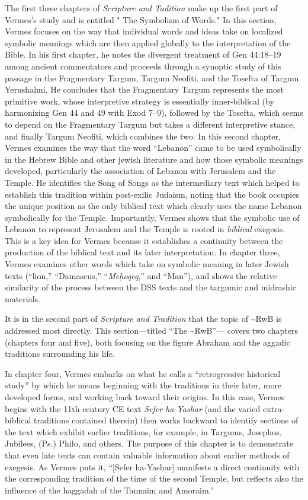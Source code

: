 The first three chapters of \emph{Scripture and Tadition} make up the
first part of Vermes's study and is entitled " The Symbolism of Words."
In this section, Vermes focuses on the way that individual words and
ideas take on localized symbolic meanings which are then applied
globally to the interpretation of the Bible. In his first chapter, he
notes the divergent treatment of Gen 44:18--19 among ancient
commentators and proceeds through a synoptic study of this passage in
the Fragmentary Targum, Targum Neofiti, and the Tosefta of Targum
Yerushalmi. He concludes that the Fragmentary Targum represents the most
primitive work, whose interpretive strategy is essentially
inner-biblical (by harmonizing Gen 44 and 49 with Exod 7--9), followed
by the Tosefta, which seems to depend on the Fragmentary Targum but
takes a different interpretive stance, and finally Targum Neofiti, which
combines the two. In this second chapter, Vermes examines the way that
the word ``Lebanon'' came to be used symbolically in the Hebrew Bible
and other jewish literature and how those symbolic meanings developed,
particularly the association of Lebanon with Jerusalem and the Temple.
He identifies the Song of Songs as the intermediary text which helped to
establish this tradition within post-exilic Judaism, noting that the
book occupies the unique position as the only biblical text which
clearly uses the name Lebanon symbolically for the Temple. Importantly,
Vermes shows that the symbolic use of Lebanon to represent Jerusalem and
the Temple is rooted in \emph{biblical} exegesis. This is a key idea for
Vermes because it establishes a continuity between the production of the
biblical text and its later interpretation. In chapter three, Vermes
examines other words which take on symbolic meaning in later Jewish
texts (``lion,'' ``Damascus,'' ``\emph{Meḥoqeq},'' and ``Man''), and
shows the relative similarity of the process between the DSS texts and
the targumic and midrashic materials.

It is in the second part of \emph{Scripture and Tradition} that the
topic of \textasciitilde{}RwB is addressed most directly. This
section---titled ``The \textasciitilde{}RwB''--- covers two chapters
(chapters four and five), both focusing on the figure Abraham and the
aggadic traditions surrounding his life.

In chapter four, Vermes embarks on what he calls a ``retrogressive
historical study'' by which he means beginning with the traditions in
their later, more developed forms, and working back toward their
origins. In this case, Vermes begins with the 11th century CE text
\emph{Sefer ha-Yashar} (and the varied extra-biblical traditions
contained therein) then works backward to identify sections of the text
which exhibit earlier traditions, for example, in Targums, Josephus,
Jubilees, (Ps.) Philo, and others. The purpose of this chapter is to
demonstrate that even late texts can contain valuable information about
earlier methods of exegesis. As Vermes puts it, ``{[}Sefer ha-Yashar{]}
manifests a direct continuity with the corresponding tradition of the
time of the second Temple, but reflects also the influence of the
haggadah of the Tannaim and Amoraim.''\autocite[95]{vermes1961}

